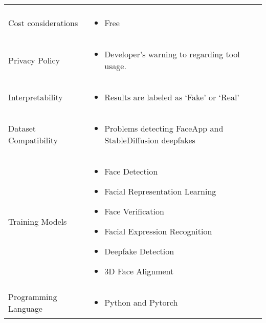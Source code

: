 \begin{table}[htpb]
\begin{tabularx}{\textwidth}{l X}
\begin{itemize}
		                               \end{itemize}                                  \\
		Cost considerations          & \begin{itemize}[nosep,nolistsep,noitemsep]
			                               \item Free
		                               \end{itemize}                                  \\
		Privacy Policy               & \begin{itemize}[nosep,nolistsep,noitemsep]
			                               \item Developer's warning to \cite{facetorch-privacy} regarding tool usage.
		                               \end{itemize} \\
		Interpretability             & \begin{itemize}[nosep,nolistsep,noitemsep]
			                               \item Results are labeled as `Fake' or `Real'
		                               \end{itemize}                               \\
		Dataset Compatibility        & \begin{itemize}[nosep,nolistsep,noitemsep]
			                               \item Problems detecting FaceApp and StableDiffusion deepfakes
		                               \end{itemize}              \\
		Training Models              & \begin{itemize}[nosep,nolistsep,noitemsep]
			                               \item Face Detection~\cite{Deng_2020_CVPR}
			                               \item Facial Representation Learning~\cite{bulat2022pretraining}
			                               \item Face Verification~\cite{jung2022unified,kim2023adaface}
			                               \item Facial Expression Recognition~\cite{9582508}
			                               \item Deepfake Detection~\cite{Luo_2022,seferbekov-github}
			                               \item 3D Face Alignment~\cite{wu2021synergy}
		                               \end{itemize}            \\
		Programming Language         & \begin{itemize}[nosep,nolistsep,noitemsep]
			                               \item Python and Pytorch
		                               \end{itemize}                                  \\
		\bottomrule
	\end{tabularx}
\end{table}

